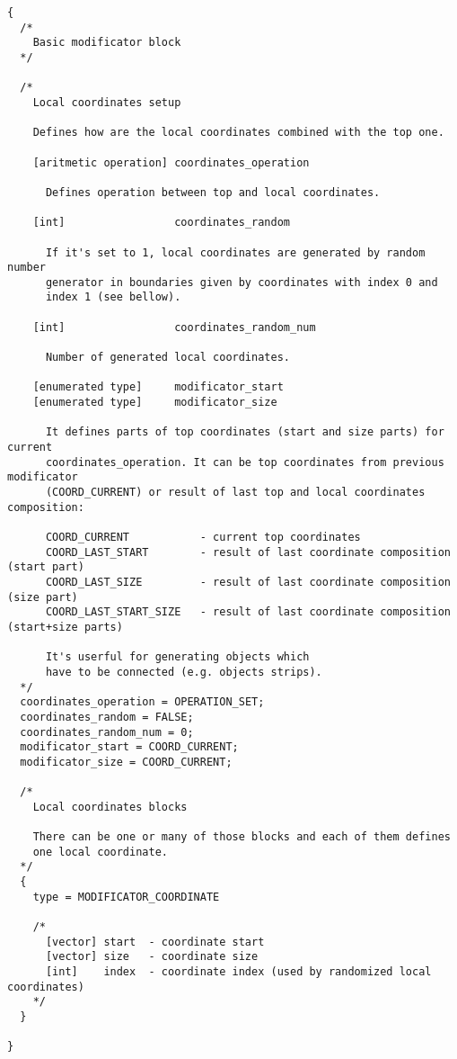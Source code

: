 \documentclass[11pt]{article}
\begin{document}
\begin{verbatim}
{
  /*
    Basic modificator block
  */

  /*
    Local coordinates setup
    
    Defines how are the local coordinates combined with the top one.
  
    [aritmetic operation] coordinates_operation 
    
      Defines operation between top and local coordinates.
    
    [int]                 coordinates_random
    
      If it's set to 1, local coordinates are generated by random number
      generator in boundaries given by coordinates with index 0 and 
      index 1 (see bellow).
      
    [int]                 coordinates_random_num
    
      Number of generated local coordinates.
    
    [enumerated type]     modificator_start
    [enumerated type]     modificator_size
      
      It defines parts of top coordinates (start and size parts) for current 
      coordinates_operation. It can be top coordinates from previous modificator 
      (COORD_CURRENT) or result of last top and local coordinates composition:
      
      COORD_CURRENT           - current top coordinates
      COORD_LAST_START        - result of last coordinate composition (start part)
      COORD_LAST_SIZE         - result of last coordinate composition (size part)
      COORD_LAST_START_SIZE   - result of last coordinate composition (start+size parts)
      
      It's userful for generating objects which 
      have to be connected (e.g. objects strips).
  */  
  coordinates_operation = OPERATION_SET;
  coordinates_random = FALSE;
  coordinates_random_num = 0;  
  modificator_start = COORD_CURRENT;
  modificator_size = COORD_CURRENT;
  
  /*
    Local coordinates blocks
    
    There can be one or many of those blocks and each of them defines
    one local coordinate.
  */
  {
    type = MODIFICATOR_COORDINATE
    
    /*
      [vector] start  - coordinate start
      [vector] size   - coordinate size
      [int]    index  - coordinate index (used by randomized local coordinates)
    */
  }

}
\end{verbatim}
\end{document}
